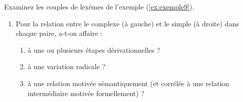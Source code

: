 Examinez les couples de lexèmes de l'exemple (\ref{ex:exemple9}).

\begin{exe}
  \ex \label{ex:exemple9}
  \begin{xlist}
    \ex \exneufcartesianisme
    \ex \exneufurbanisme
    \ex \exneufhistoricisme
    \ex \exneufcellularisme
  \end{xlist}
\end{exe}

\begin{enumerate}
\item Pour la relation entre le complexe (à gauche) et le simple (à droite) dans chaque paire, a-t-on affaire :
  \begin{enumerate}
  \item à une ou plusieurs étapes dérivationnelles ?
  \item à une variation radicale ?
  \item à une relation motivée sémantiquement (et corrélée à une relation intermédiaire motivée formellement) ?
  \end{enumerate}
\end{enumerate}



